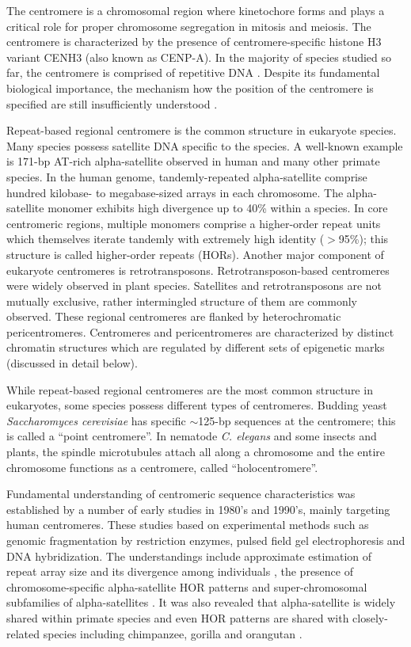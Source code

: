 The centromere is a chromosomal region where kinetochore forms and plays a critical role for proper chromosome segregation in mitosis and meiosis. The centromere is characterized by the presence of centromere-specific histone H3 variant CENH3 (also known as CENP-A). In the majority of species studied so far, the centromere is comprised of repetitive DNA \cite{Plohl2014}. Despite its fundamental biological importance, the mechanism how the position of the centromere is specified are still insufficiently understood \cite{McKinley2016}.

Repeat-based regional centromere is the common structure in eukaryote species. Many species possess satellite DNA specific to the species. A well-known example is 171-bp AT-rich alpha-satellite observed in human and many other primate species. In the human genome, tandemly-repeated alpha-satellite comprise hundred kilobase- to megabase-sized arrays in each chromosome. The alpha-satellite monomer exhibits high divergence up to 40\% within a species. In core centromeric regions, multiple monomers comprise a higher-order repeat units which themselves iterate tandemly with extremely high identity ($>$95\%); this structure is called higher-order repeats (HORs). Another major component of eukaryote centromeres is retrotransposons. Retrotransposon-based centromeres were widely observed in plant species. Satellites and retrotransposons are not mutually exclusive, rather intermingled structure of them are commonly observed. These regional centromeres are flanked by heterochromatic pericentromeres. Centromeres and pericentromeres are characterized by distinct chromatin structures which are regulated by different sets of epigenetic marks (discussed in detail below).

While repeat-based regional centromeres are the most common structure in eukaryotes, some species possess different types of centromeres. Budding yeast \textit{Saccharomyces cerevisiae} has specific $\sim$125-bp sequences at the centromere; this is called a ``point centromere''. In nematode \textit{C. elegans} and some insects and plants, the spindle microtubules attach all along a chromosome and the entire chromosome functions as a centromere, called ``holocentromere''.

Fundamental understanding of centromeric sequence characteristics was established by a number of early studies in 1980's and 1990's, mainly targeting human centromeres. These studies based on experimental methods such as genomic fragmentation by restriction enzymes, pulsed field gel electrophoresis and DNA hybridization. The understandings include approximate estimation of repeat array size and its divergence among individuals \cite{Oakey1990}, the presence of chromosome-specific alpha-satellite HOR patterns \cite{Willard1987} and super-chromosomal subfamilies of alpha-satellites \cite{Alexandrov2001}. It was also revealed that alpha-satellite is widely shared within primate species and even HOR patterns are shared with closely-related species including chimpanzee, gorilla and orangutan \cite{Willard1991}.

